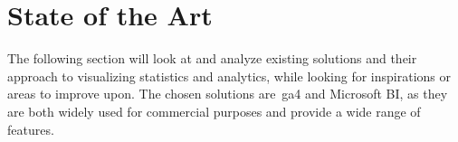 \section{State of the Art}\label{sec:state-of-the-art}

The following section will look at and analyze existing solutions and their approach to visualizing statistics and
analytics, while looking for inspirations or areas to improve upon.
The chosen solutions are~\acrlong{ga4} and Microsoft BI, as they are both widely used for commercial purposes and
provide a wide range of features.



